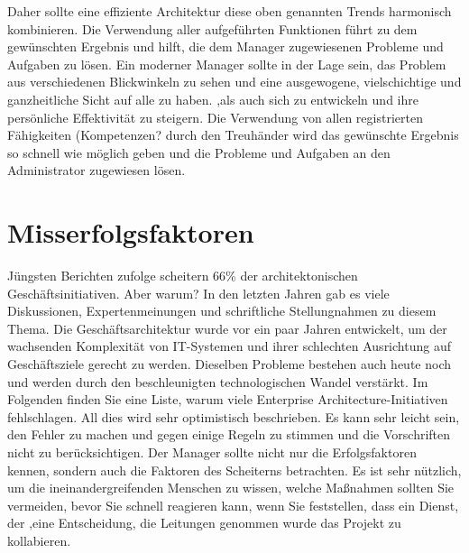 \documentclass[
	A4paper,
	DIV=9,
	BCOR7mm,
	smallheadings,
	headinclude,
	footinclude,
	headsepline,
	parindent,
	german,
	captions=tableheading,
	abstracton
	]{scrreprt}
\begin{document}
Daher sollte eine effiziente Architektur diese oben genannten Trends harmonisch kombinieren. Die Verwendung aller aufgeführten Funktionen führt zu dem gewünschten Ergebnis und hilft, die dem Manager zugewiesenen Probleme und Aufgaben zu lösen. Ein moderner Manager sollte in der Lage sein, das Problem aus verschiedenen Blickwinkeln zu sehen und eine ausgewogene, vielschichtige und ganzheitliche Sicht auf alle zu haben. ,als auch sich zu entwickeln und ihre persönliche Effektivität zu steigern. Die Verwendung von allen registrierten Fähigkeiten (Kompetenzen? durch den Treuhänder wird das gewünschte Ergebnis so schnell wie möglich geben und die Probleme und Aufgaben an den Administrator zugewiesen lösen.


\section{Misserfolgsfaktoren}
Jüngsten Berichten zufolge scheitern 66\% der architektonischen Geschäftsinitiativen. Aber warum? In den letzten Jahren gab es viele Diskussionen, Expertenmeinungen und schriftliche Stellungnahmen zu diesem Thema.
Die Geschäftsarchitektur wurde vor ein paar Jahren entwickelt, um der wachsenden Komplexität von IT-Systemen und ihrer schlechten Ausrichtung auf Geschäftsziele gerecht zu werden. Dieselben Probleme bestehen auch heute noch und werden durch den beschleunigten technologischen Wandel verstärkt.
Im Folgenden finden Sie eine Liste, warum viele Enterprise Architecture-Initiativen fehlschlagen.
All dies wird sehr optimistisch beschrieben. Es kann sehr leicht sein, den Fehler zu machen und gegen einige Regeln zu stimmen und die Vorschriften nicht zu berücksichtigen. Der Manager sollte nicht nur die Erfolgsfaktoren kennen, sondern auch die Faktoren des Scheiterns betrachten.
Es ist sehr nützlich, um die ineinandergreifenden Menschen zu wissen, welche Maßnahmen sollten Sie vermeiden, bevor Sie schnell reagieren kann, wenn Sie feststellen, dass ein Dienst, der ‚eine Entscheidung, die Leitungen genommen wurde das Projekt zu kollabieren.
\end{document}
